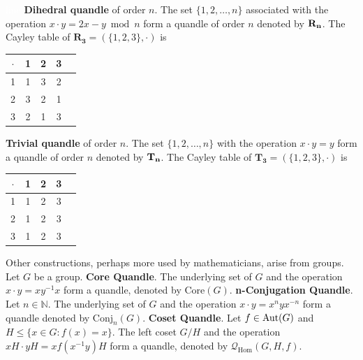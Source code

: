 \documentclass{mcom-l}
\begin{document}
\begin{example} \cite{bianco2021connected, JOYCE198237,lopes2006finite}\label{quandleConst}\textcolor{white}{line}\newline
\textbf{Dihedral quandle} of order $n$. The set $\{1,2,\dots,n\}$ associated with the operation  $x \cdot y = 2x-y \bmod n$ form a quandle of order $n$ denoted by $\mathbf{R_n}$. \newline
The Cayley table of $\mathbf{R_3} = (\{1,2,3\}, \cdot)$ is
\begin{center}
    \begin{tabular}{c|c c c c}
         $\cdot$ & 1 & 2 & 3 \\
         \hline
          1 & 1 & 3 & 2\\
          2 & 3 & 2 & 1\\
          3 & 2 & 1 & 3
    \end{tabular}
\end{center}


 
\noindent \textbf{Trivial quandle} of order $n$. The set $\{1,2,\dots,n\}$ with the operation  $x \cdot y = y$ form a quandle of order $n$ denoted by $\mathbf{T_n}$.\newline
The Cayley table of $\mathbf{T_3} = (\{1,2,3\}, \cdot)$ is
\begin{center}
    \begin{tabular}{c|c c c c}
         $\cdot$ & 1 & 2 & 3 \\
         \hline
          1 & 1 & 2 & 3\\
          2 & 1 & 2 & 3\\
          3 & 1 & 2 & 3
    \end{tabular}
\end{center}
Other constructions, perhaps more used by mathematicians, arise from groups. \newline\newline
Let $G$ be a group.\newline\newline
\textbf{Core Quandle}. The underlying set of $G$ and the operation $x \cdot y = xy^{-1}x$ form a quandle, denoted by $\text{Core}(G)$.\newline\newline
\textbf{n-Conjugation Quandle}. 
    Let $n \in \mathbb{N}$. The underlying set of  $G$ and the operation $x \cdot y = x^nyx^{-n}$ form a quandle denoted by $\text{Conj}_n(G)$.\newline\newline
\textbf{Coset Quandle}. Let $f \in \operatorname{Aut}(G)$ and  $H \leq \{x \in G : f(x) = x\}$.\newline
The left coset $G/H$ and the operation $xH \cdot yH = xf(x^{-1}y)H$ form a quandle, denoted by  $\mathcal{Q}_{\text{Hom}}(G,H,f)$.

\end{example}
\end{document}
